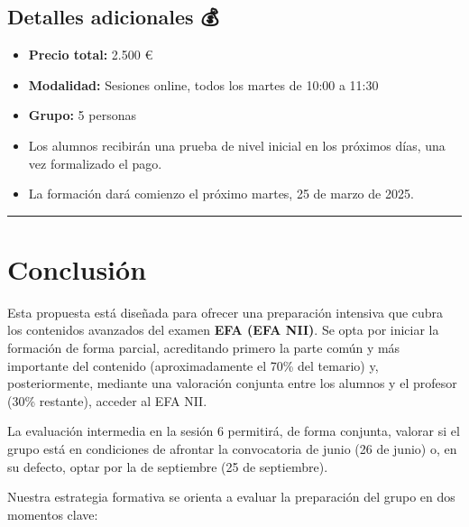 \documentclass[
  letterpaper,
  DIV=11,
  numbers=noendperiod]{scrreprt}
\providecommand{\tightlist}{%
  \setlength{\itemsep}{0pt}\setlength{\parskip}{0pt}}\usepackage{longtable,booktabs,array}
\begin{document}
\subsection*{Detalles adicionales 💰}\label{detalles-adicionales}

\begin{itemize}
\tightlist
\item
  \textbf{Precio total:} 2.500 €\\
\item
  \textbf{Modalidad:} Sesiones online, todos los martes de 10:00 a
  11:30\\
\item
  \textbf{Grupo:} 5 personas\\
\item
  Los alumnos recibirán una prueba de nivel inicial en los próximos
  días, una vez formalizado el pago.\\
\item
  La formación dará comienzo el próximo martes, 25 de marzo de 2025.
\end{itemize}

\begin{center}\rule{0.5\linewidth}{0.5pt}\end{center}

\section*{Conclusión 🔔}\label{conclusiuxf3n}


Esta propuesta está diseñada para ofrecer una preparación intensiva que
cubra los contenidos avanzados del examen \textbf{EFA (EFA NII)}. Se
opta por iniciar la formación de forma parcial, acreditando primero la
parte común y más importante del contenido (aproximadamente el 70\% del
temario) y, posteriormente, mediante una valoración conjunta entre los
alumnos y el profesor (30\% restante), acceder al EFA NII.

La evaluación intermedia en la sesión 6 permitirá, de forma conjunta,
valorar si el grupo está en condiciones de afrontar la convocatoria de
junio (26 de junio) o, en su defecto, optar por la de septiembre (25 de
septiembre).

Nuestra estrategia formativa se orienta a evaluar la preparación del
grupo en dos momentos clave:
\end{document}
